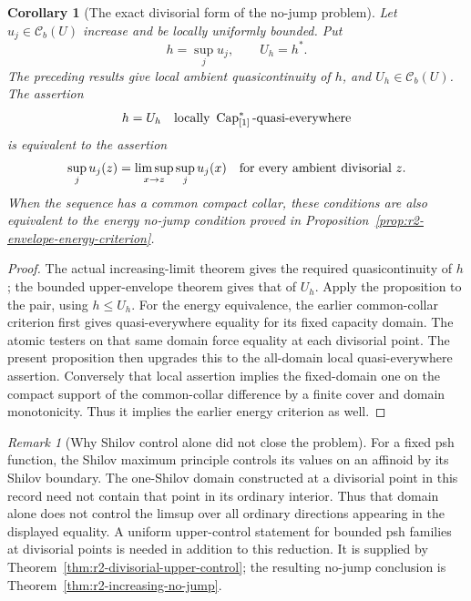 \documentclass[11pt,a4paper]{article}
\numberwithin{equation}{section}
\newtheorem{corollary}[theorem]{Corollary}
\theoremstyle{definition}
\theoremstyle{remark}
\newtheorem{remark}[theorem]{Remark}
\newcommand{\Cb}{\mathcal C_b}
\begin{document}
\begin{corollary}[The exact divisorial form of the no-jump problem]
\label{cor:r2-divisorial-nojump-reduction}
Let $u_j\in\Cb(U)$ increase and be locally uniformly bounded.
Put
\[
 h=\sup_j u_j,\qquad U_h=h^*.
\]
The preceding results give local ambient quasicontinuity of
$h$, and $U_h\in\Cb(U)$. The assertion
\[
 h=U_h\quad\hbox{locally }
       \operatorname{Cap}_{[1]}^*\hbox{-quasi-everywhere}
\]
is equivalent to the assertion
\[
 \sup_j u_j(z)
   =\limsup_{x\to z}\sup_j u_j(x)
       \quad\hbox{for every ambient divisorial }z.
\]
When the sequence has a common compact collar, these conditions
are also equivalent to the energy no-jump condition proved in
Proposition~\ref{prop:r2-envelope-energy-criterion}.
\end{corollary}

\begin{proof}
The actual increasing-limit theorem gives the required
quasicontinuity of $h$; the bounded upper-envelope theorem
gives that of $U_h$. Apply the proposition to the pair, using
$h\leq U_h$. For the energy equivalence, the earlier
common-collar criterion first gives quasi-everywhere equality
for its fixed capacity domain. The atomic testers on that
same domain force equality at each divisorial point. The
present proposition then upgrades this to the all-domain
local quasi-everywhere assertion. Conversely that local
assertion implies the fixed-domain one on the compact support
of the common-collar difference by a finite cover and domain
monotonicity. Thus it implies the earlier energy criterion as well.
\end{proof}

\begin{remark}[Why Shilov control alone did not close the problem]
For a fixed psh function, the Shilov maximum principle controls
its values on an affinoid by its Shilov boundary. The one-Shilov
domain constructed at a divisorial point in this record need
not contain that point in its ordinary interior. Thus that
domain alone does not control the limsup over all ordinary
directions appearing in the displayed equality. A uniform
upper-control statement for bounded psh families at divisorial
points is needed in addition to this reduction. It is supplied
by Theorem~\ref{thm:r2-divisorial-upper-control}; the resulting
no-jump conclusion is Theorem~\ref{thm:r2-increasing-no-jump}.
\end{remark}


\end{document}
